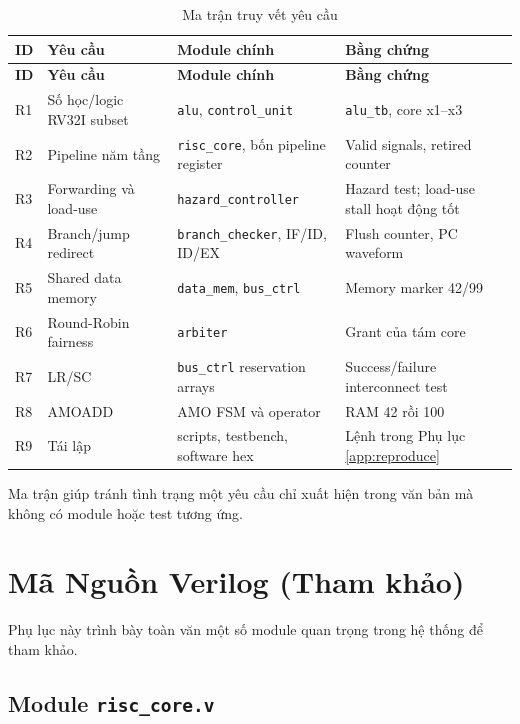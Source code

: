 \begin{longtable}{p{} p{} p{} p{}}
\caption{Ma trận truy vết yêu cầu}\label{tab:traceability}\\
\toprule
\textbf{ID} & \textbf{Yêu cầu} & \textbf{Module chính} & \textbf{Bằng chứng} \\
\midrule
\endfirsthead
\toprule
\textbf{ID} & \textbf{Yêu cầu} & \textbf{Module chính} & \textbf{Bằng chứng} \\
\midrule
\endhead
R1 & Số học/logic RV32I subset & \texttt{alu}, \texttt{control\_unit} & \texttt{alu\_tb}, core x1--x3 \\
R2 & Pipeline năm tầng & \texttt{risc\_core}, bốn pipeline register & Valid signals, retired counter \\
R3 & Forwarding và load-use & \texttt{hazard\_controller} & Hazard test; load-use stall hoạt động tốt \\
R4 & Branch/jump redirect & \texttt{branch\_checker}, IF/ID, ID/EX & Flush counter, PC waveform \\
R5 & Shared data memory & \texttt{data\_mem}, \texttt{bus\_ctrl} & Memory marker 42/99 \\
R6 & Round-Robin fairness & \texttt{arbiter} & Grant của tám core \\
R7 & LR/SC & \texttt{bus\_ctrl} reservation arrays & Success/failure interconnect test \\
R8 & AMOADD & AMO FSM và operator & RAM 42 rồi 100 \\
R9 & Tái lập & scripts, testbench, software hex & Lệnh trong Phụ lục \ref{app:reproduce} \\
\bottomrule
\end{longtable}

Ma trận giúp tránh tình trạng một yêu cầu chỉ xuất hiện trong văn bản mà không có module hoặc test tương ứng.

\chapter{Mã Nguồn Verilog (Tham khảo)}
\label{app:source_code}
Phụ lục này trình bày toàn văn một số module quan trọng trong hệ thống để tham khảo.

\section{Module \texttt{risc\_core.v}}


